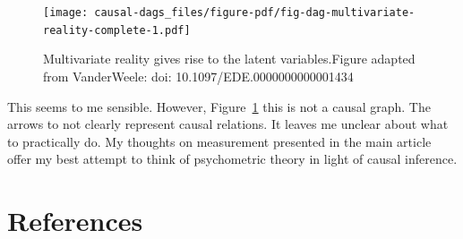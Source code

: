 \documentclass[
  singlecolumn]{report}
\begin{document}
\begin{figure}

{\centering \texttt{[image: causal-dags\_files/figure-pdf/fig-dag-multivariate-reality-complete-1.pdf]}

}

\caption{\label{fig-dag-multivariate-reality-complete}Multivariate
reality gives rise to the latent variables.Figure adapted from
VanderWeele: doi: 10.1097/EDE.0000000000001434}

\end{figure}

This seems to me sensible. However,
Figure~\ref{fig-dag-multivariate-reality-complete} this is not a causal
graph. The arrows to not clearly represent causal relations. It leaves
me unclear about what to practically do. My thoughts on measurement
presented in the main article offer my best attempt to think of
psychometric theory in light of causal inference.

\hypertarget{references}{%
\section*{References}\label{references}}
\end{document}

